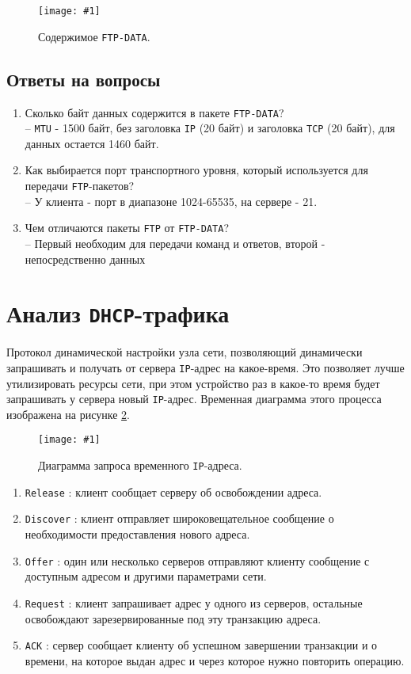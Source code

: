 \documentclass[12pt, a4paper]{article}
\newcommand{\figc}[4]{
  \begin{figure}[H]
  \begin{center}
    \texttt{[image: \#1]}
    \caption{#2}
    \label{fig:#3}
  \end{center}
  \end{figure}
}
\begin{document}
\figc{ftp_data}{Содержимое \texttt{FTP-DATA}.}{f_dt}{2.5}

\subsection{Ответы на вопросы}

\begin{enumerate}
  \item Сколько байт данных содержится в пакете \texttt{FTP-DATA}?\\
    -- \texttt{MTU} - 1500 байт, без заголовка \texttt{IP} (20 байт) и
    заголовка \texttt{TCP} (20 байт), для данных остается 1460 байт.
  \item Как выбирается порт транспортного уровня, который используется для
    передачи \texttt{FTP}-пакетов?\\
    -- У клиента - порт в диапазоне 1024-65535, на сервере - 21.
  \item Чем отличаются пакеты \texttt{FTP} от \texttt{FTP-DATA}?\\
    -- Первый необходим для передачи команд и ответов, второй - непосредственно
    данных
\end{enumerate}

\section{Анализ \texttt{DHCP}-трафика}

Протокол динамической настройки узла сети, позволяющий динамически запрашивать
и получать от сервера \texttt{IP}-адрес на какое-время. Это позволяет лучше
утилизировать ресурсы сети, при этом устройство раз в какое-то время будет
запрашивать у сервера новый \texttt{IP}-адрес. Временная диаграмма этого
процесса изображена на рисунке \ref{fig:dh_sc}.

\figc{dhcp_scheme}{Диаграмма запроса временного \texttt{IP}-адреса.}{dh_sc}{0.3}

\begin{enumerate}
  \item \texttt{Release} : клиент сообщает серверу об освобождении адреса.
  \item \texttt{Discover} : клиент отправляет широковещательное сообщение о
    необходимости предоставления нового адреса.
  \item \texttt{Offer} : один или несколько серверов отправляют клиенту
    сообщение с доступным адресом и другими параметрами сети.
  \item \texttt{Request} : клиент запрашивает адрес у одного из серверов,
    остальные освобождают зарезервированные под эту транзакцию адреса.
  \item \texttt{ACK} : сервер сообщает клиенту об успешном завершении транзакции
    и о времени, на которое выдан адрес и через которое нужно повторить операцию.
\end{enumerate}
\end{document}

